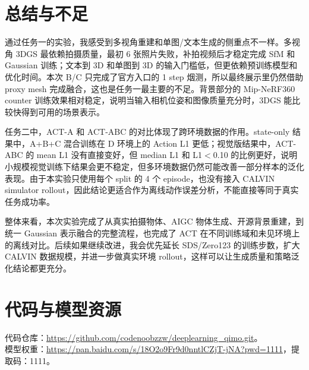 \documentclass[11pt,a4paper]{ctexart}
\begin{document}
\section{总结与不足}
通过任务一的实验，我感受到多视角重建和单图/文本生成的侧重点不一样。多视角 3DGS 最依赖拍摄质量，最初 6 张照片失败，补拍视频后才稳定完成 SfM 和 Gaussian 训练；文本到 3D 和单图到 3D 的输入门槛低，但更依赖预训练模型和优化时间。本次 B/C 只完成了官方入口的 1 step 烟测，所以最终展示里仍然借助 proxy mesh 完成融合，这也是任务一最主要的不足。背景部分的 Mip-NeRF360 counter 训练效果相对稳定，说明当输入相机位姿和图像质量充分时，3DGS 能比较快得到可用的场景表示。

任务二中，ACT-A 和 ACT-ABC 的对比体现了跨环境数据的作用。state-only 结果中，A+B+C 混合训练在 D 环境上的 Action L1 更低；视觉版结果中，ACT-ABC 的 mean L1 没有直接变好，但 median L1 和 L1$<$0.10 的比例更好，说明小规模视觉训练下结果会更不稳定，但多环境数据仍然可能改善一部分样本的泛化表现。由于本实验只使用每个 split 的 4 个 episode，也没有接入 CALVIN simulator rollout，因此结论更适合作为离线动作误差分析，不能直接等同于真实任务成功率。

整体来看，本次实验完成了从真实拍摄物体、AIGC 物体生成、开源背景重建，到统一 Gaussian 表示融合的完整流程，也完成了 ACT 在不同训练域和未见环境上的离线对比。后续如果继续改进，我会优先延长 SDS/Zero123 的训练步数，扩大 CALVIN 数据规模，并进一步做真实环境 rollout，这样可以让生成质量和策略泛化结论都更充分。

\section*{代码与模型资源}
代码仓库：\url{https://github.com/codenoobzzw/deeplearning_qimo.git}。\\
模型权重：\url{https://pan.baidu.com/s/18O2o9Fr9d0nntlCZjT-jNA?pwd=1111}，提取码：1111。



\end{document}

